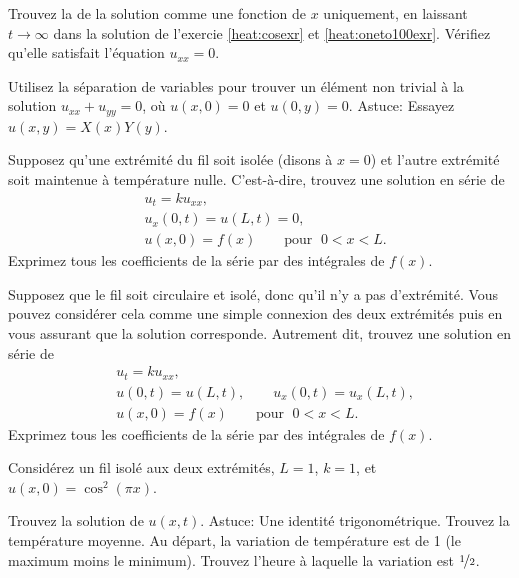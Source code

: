 \begin{exercise}
Trouvez la \emph{} de la solution comme une fonction de $x$ uniquement,
en laissant $t \to
\infty$ dans la solution de l'exercie \ref{heat:cosexr} et \ref{heat:oneto100exr}.
Vérifiez qu'elle satisfait l'équation $u_{xx} = 0$.
\end{exercise}

\begin{exercise}
Utilisez la séparation de variables pour trouver un élément non trivial à la
solution  $ u_ {xx} + u_ {yy} = 0 $,  où $ u (x, 0) = 0 $ et $ u (0, y) = 0 $.
Astuce: Essayez$u(x,y) = X(x)Y(y)$.
\end{exercise}

\begin{exercise}[challenging]
Supposez qu'une extrémité du fil soit isolée (disons à $ x = 0 $) et
l'autre extrémité soit maintenue à température nulle.  C'est-à-dire,
trouvez une solution en série de
\begin{align*}
& u_t = k u_{xx} , \\
& u_x(0,t) = u(L,t) = 0 , \\
& u(x,0) = f(x) \qquad \text{pour } \; 0 < x < L .
\end{align*}
Exprimez tous les coefficients de la série par des intégrales de $f(x)$.
\end{exercise}

\begin{exercise}[challenging]
Supposez que le fil soit circulaire et isolé,  donc qu'il n'y a pas d'extrémité.
Vous pouvez considérer cela comme une simple connexion des deux extrémités puis
en vous assurant que la solution corresponde.
Autrement dit,  trouvez une solution en série de
\begin{align*}
& u_t = k u_{xx} , \\
& u(0,t) = u(L,t) , \qquad
u_x(0,t) = u_x(L,t) , \\
& u(x,0) = f(x) \qquad \text{pour } \; 0 < x < L .
\end{align*}
Exprimez tous les coefficients de la série par des intégrales de  $f(x)$.
\end{exercise}

\begin{exercise}
Considérez un fil isolé aux deux extrémités,  $L=1$, $k=1$,
et $u(x,0) = \cos^2(\pi x)$.
\begin{tasks}
\task
Trouvez la solution de $u(x,t)$.  Astuce: Une identité trigonométrique.
\task
Trouvez la température moyenne.
\task
Au départ,  la variation de température est de 1 (le maximum moins le minimum).
Trouvez l'heure à laquelle la variation est $\nicefrac{1}{2}$.
\end{tasks}
\end{exercise}


